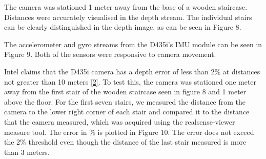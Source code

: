 \documentclass{article}
\begin{document}
The camera was stationed 1 meter away from the base of a wooden staircase. Distances were accurately visualised in the depth stream. The individual stairs can be clearly distinguished in the depth image, as can be seen in Figure 8.

The accelerometer and gyro streams from the D435i's IMU module can be seen in Figure 9. Both of the sensors were responsive to camera movement. 



Intel claims that the D435i camera has a depth error of less than 2\% at distances not greater than 10 meters \href{https://www.intelrealsense.com/depth-camera-d435i/}{[2]}. To test this, the camera was stationed one meter away from the first stair of the wooden staircase seen in figure 8 and 1 meter above the floor. For the first seven stairs, we measured the distance from the camera to the lower right corner of each stair and compared it to the distance that the camera measured, which was acquired using the realsense-viewer measure tool. The error in \% is plotted in Figure 10. The error does not exceed the 2\% threshold even though the distance of the last stair measured is more than 3 meters.

\clearpage
\end{document}
